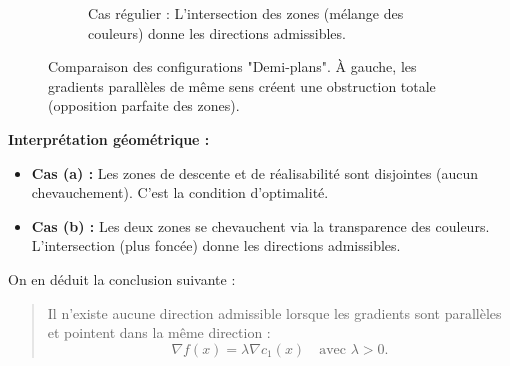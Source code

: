 \begin{figure}[H]
\begin{subfigure}[b]{0.45\textwidth}
    \caption{Cas régulier : L'intersection des zones (mélange des couleurs) donne les directions admissibles.}
\end{subfigure}
\caption{Comparaison des configurations "Demi-plans". À gauche, les gradients parallèles de même sens créent une obstruction totale (opposition parfaite des zones).}
\label{fig:admissible-comparison}
\end{figure}

\begin{figureexplanation}
\textbf{Interprétation géométrique :}
\begin{itemize}
    \item \textbf{Cas (a) :} Les zones de descente et de réalisabilité sont disjointes (aucun chevauchement). C'est la condition d'optimalité.
    \item \textbf{Cas (b) :} Les deux zones se chevauchent via la transparence des couleurs. L'intersection (plus foncée) donne les directions admissibles.
\end{itemize}
\end{figureexplanation}

On en déduit la conclusion suivante :
\begin{quote}
Il n'existe aucune direction admissible lorsque les gradients sont parallèles et pointent dans la même direction :
\begin{equation}
    \nabla f(x) = \lambda \nabla c_1(x) \quad \text{avec } \lambda > 0.
\end{equation}
\end{quote}

